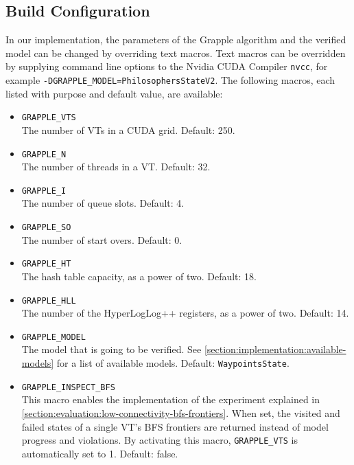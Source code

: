 \documentclass[
fancyheadings, %
%
%
]{stsreprt}
\begin{document}

\subsection{Build Configuration}
\label{section:implementation:build-configuration}

In our implementation, the parameters of the Grapple algorithm and the verified model can be changed by overriding text macros.
Text macros can be overridden by supplying command line options to the Nvidia CUDA Compiler \texttt{nvcc}, for example \mbox{\texttt{-DGRAPPLE\_MODEL=PhilosophersStateV2}}.
The following macros, each listed with purpose and default value, are available:

\begin{itemize}
    \item \texttt{GRAPPLE\_VTS} \\
          The number of VTs in a CUDA grid.
          Default: 250.

    \item \texttt{GRAPPLE\_N} \\
          The number of threads in a VT.
          Default: 32.

    \item \texttt{GRAPPLE\_I} \\
          The number of queue slots.
          Default: 4.

    \item \texttt{GRAPPLE\_SO} \\
          The number of start overs.
          Default: 0.

    \item \texttt{GRAPPLE\_HT} \\
          The hash table capacity, as a power of two.
          Default: 18.

    \item \texttt{GRAPPLE\_HLL} \\
          The number of the HyperLogLog++ registers, as a power of two.
          Default: 14.

    \item \texttt{GRAPPLE\_MODEL} \\
          The model that is going to be verified.
          See \cref{section:implementation:available-models} for a list of available models.
          Default: \texttt{WaypointsState}.

    \item \texttt{GRAPPLE\_INSPECT\_BFS} \\
          This macro enables the implementation of the experiment explained in \cref{section:evaluation:low-connectivity-bfs-frontiers}.
          When set, the visited and failed states of a single VT's BFS frontiers are returned instead of model progress and violations.
          By activating this macro, \texttt{GRAPPLE\_VTS} is automatically set to 1.
          Default: false.
\end{itemize}
\end{document}
